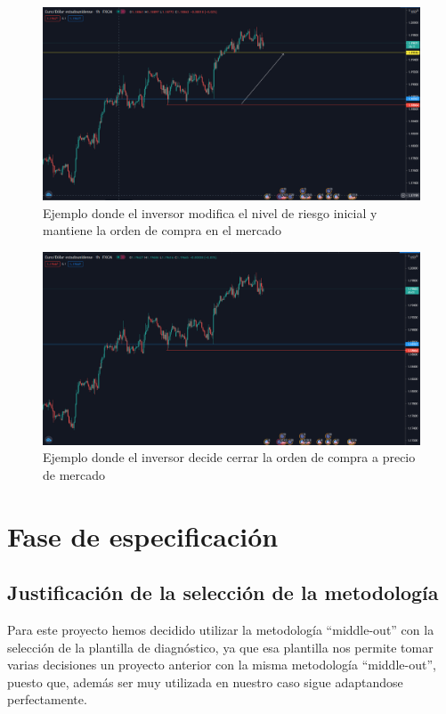 \begin{figure}[H]
  \centering
  \includegraphics[scale=0.30]{imagenes/Situacion12.png}
  \caption{\label{fig:Situacion12}Ejemplo donde el inversor modifica el nivel de riesgo inicial y mantiene la orden de compra en el mercado}
\end{figure}
\begin{figure}[H]
  \centering
  \includegraphics[scale=0.30]{imagenes/Situacion1.png}
  \caption{\label{fig:Situacion2}Ejemplo donde el inversor decide cerrar la orden de compra a precio de mercado}
\end{figure}

\section{Fase de especificación}
\subsection{Justificación de la selección de la metodología}
Para este proyecto hemos decidido utilizar la metodología ``middle-out'' con la selección de la plantilla de diagnóstico, ya que esa plantilla nos permite tomar varias decisiones un proyecto anterior con la misma metodología ``middle-out'', puesto que, además ser muy utilizada en nuestro caso sigue adaptandose perfectamente. 

